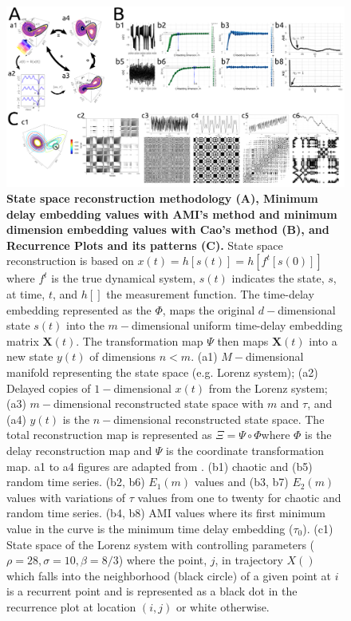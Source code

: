 \documentclass[fleqn,10pt]{wlscirep}
\begin{document}
\begin{figure}[ht]
\centering
\includegraphics[width=1.0\textwidth]{figures/fig01/versions/drawing-v01}
    \caption{
	{\bf State space reconstruction methodology (A),
		Minimum delay embedding values with AMI's method and minimum dimension embedding values with Cao's method (B), and Recurrence Plots and its patterns (C).
	}
		State space reconstruction is based on $x(t)=h[s(t)]= h[f^t [s(0)]]$ where $f^t$ is the true dynamical system, $s(t)$ indicates the state, $s$, at time, $t$,  and $h[ ]$ the measurement function.
		The time-delay embedding represented as the $\Phi$, maps the original $d-$dimensional state $s(t)$ into the $m-$dimensional uniform time-delay embedding matrix $\boldsymbol{X}(t)$.
    	The transformation map $\Psi$ then maps $\boldsymbol{X}(t)$ into a new state $y(t)$ of dimensions $n < m$.
    	(a1) $M-$dimensional manifold representing the state space (e.g. Lorenz system);
    	(a2) Delayed copies of $1-$dimensional $x(t)$ from the Lorenz system;
		(a3) $m-$dimensional reconstructed state space with \texorpdfstring{$m$}{m} and    \texorpdfstring{$\tau$}{T}, and
    	(a4) $y(t)$ is the $n-$dimensional reconstructed state space.
	The total reconstruction map is represented as $\Xi = \Psi \circ \Phi $where $\Phi$ is the delay reconstruction map and $\Psi$ is the coordinate transformation map.
	a1 to a4 figures are adapted from \cite{Quintana-Duque2012, casdagli1991, uzal2011}.
	(b1) chaotic and (b5) random time series.
	(b2, b6) $E_1 (m)$ values and (b3, b7) $E_2(m)$ values with variations of $\tau$ values from one to twenty for chaotic and random time series.
	(b4, b8) AMI values where its first minimum value in the curve is the minimum time delay embedding ($\tau_0$).
	(c1) State space of the Lorenz system with controlling parameters ($\rho=28, \sigma=10, \beta=8/3$) where the point, $j$, in trajectory $X()$ which falls into the neighborhood (black circle) of a given point at $i$ is a recurrent point and is represented as a black dot in the recurrence plot at location $(i, j)$ or white otherwise.
}
\end{figure}
\end{document}
